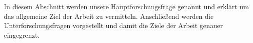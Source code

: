 In diesem Abschnitt werden unsere Hauptforschungsfrage genannt und erklärt um das allgemeine Ziel der Arbeit zu vermitteln. Anschließend werden die Unterforschungsfragen vorgestellt und damit die Ziele der Arbeit genauer eingegrenzt.